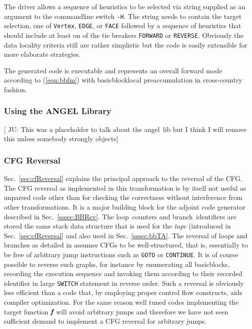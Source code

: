 \documentclass{book}
\newcommand{\angel}{angel}
\newcommand{\Loop}{loop}
\newcommand{\branch}{branch}
\newcommand{\basicblock}{basicblock}
\newcommand{\bmf}{\mbox{\bf\em f}}
\newcommand{\code}[1]{{\small\tt{#1}}}
\newcommand{\refsec}[1]{{Sec.~\ref{#1}}}
\newcommand{\refeqn}[1]{{(\ref{#1})}}
\begin{document}
The driver allows a sequence of heuristics to be selected via string supplied as 
an argument to the commandline switch \code{-H}. The string needs to contain 
the target selection, one of \code{Vertex}, \code{EDGE}, or \code{FACE} followed by 
a sequence of heuristics that should include at least on of the tie breakers \code{FORWARD} or 
\code{REVERSE}. 
Obviously the data locality criteria still are rather simplistic but 
the code is easily extensible for more elaborate strategies. 

The generated code is executable and represents an overall forward mode 
according to \refeqn{eqn:bbfm} with \basicblock\-local preaccumulation in 
cross-country fashion. 

\subsubsection{Using the ANGEL Library}\label{sssec:angel}
{\color{red} [ JU: This was a placeholder to talk about the \angel\ lib 
  but I think I will remove this unless somebody strongly objects]}
\subsubsection{CFG Reversal}\label{sssec:cfgRevAlg}

\refsec{sec:cfReversal} explains the principal approach to the reversal 
of the CFG. The CFG reversal as implemented in this transformation is 
by itself not useful as unparsed code other than for checking the correctness without 
interference from other transformations. It is a major building block for 
the  
adjoint code generator described in \refsec{sssec:BBRev}. 
The \Loop\ counters and \branch\ identifiers are stored the same 
stack data structure that is used for the {\em tape} (introduced in 
\refsec{sec:cfReversal} and also used in \refsec{sssec:bbTA}.  
The reversal of loops and branches as detailed in \cite{NULF04CFR} assumes 
CFGs to be well-structured, that is, essentially to be free of arbitrary jump instructions 
such as \code{GOTO} or \code{CONTINUE}. 
It is of course possible to reverse such graphs, for instance by enumerating
all {\basicblock}s, recording the execution sequence and invoking them according 
to their recorded identifier in  large  \code {SWITCH} statement in reverse order.
Such a reversal is obviously less efficient than a code that, by employing proper 
control flow constructs, aids compiler optimization. 
For the same reason well tuned codes implementing the target function $\bmf$ will 
avoid arbitrary jumps and therefore we have not seen sufficient demand to implement 
a CFG reversal for arbitrary jumps. 
\end{document}
